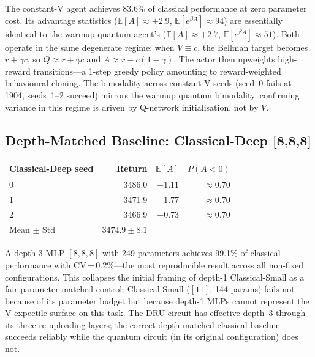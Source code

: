\documentclass[10pt,a4paper]{article}
\begin{document}
The constant-V agent achieves 83.6\% of classical performance at zero
parameter cost.
Its advantage statistics ($\mathbb{E}[A]\approx+2.9$,
$\mathbb{E}[e^{\beta A}]\approx94$) are essentially identical to the warmup
quantum agent's ($\mathbb{E}[A]\approx+2.7$, $\mathbb{E}[e^{\beta A}]\approx51$).
Both operate in the same degenerate regime: when $V\equiv c$, the Bellman
target becomes $r+\gamma c$, so $Q\approx r+\gamma c$ and
$A\approx r-c(1-\gamma)$.
The actor then upweights high-reward transitions---a 1-step greedy policy
amounting to reward-weighted behavioural cloning.
The bimodality across constant-V seeds (seed~0 fails at 1904, seeds~1--2
succeed) mirrors the warmup quantum bimodality, confirming variance in this
regime is driven by Q-network initialisation, not by $V$.

\subsection{Depth-Matched Baseline: Classical-Deep [8,8,8]}

\begin{center}
\setlength{\tabcolsep}{8pt}
\begin{tabular}{lrrr}
\toprule
Classical-Deep seed & Return & $\mathbb{E}[A]$ & $P(A{<}0)$ \\
\midrule
0 & 3486.0 & $-1.11$ & $\approx0.70$ \\
1 & 3471.9 & $-1.77$ & $\approx0.70$ \\
2 & 3466.9 & $-0.73$ & $\approx0.70$ \\
\midrule
Mean $\pm$ Std & $3474.9 \pm 8.1$ & & \\
\bottomrule
\end{tabular}
\end{center}

A depth-3 MLP $[8,8,8]$ with 249 parameters achieves 99.1\% of classical
performance with CV\,=\,0.2\%---the most reproducible result across all
non-fixed configurations.
This collapses the initial framing of depth-1 Classical-Small as a fair
parameter-matched control: Classical-Small ($[11]$, 144 params) fails not
because of its parameter budget but because depth-1 MLPs cannot represent
the V-expectile surface on this task.
The DRU circuit has effective depth~3 through its three re-uploading layers;
the correct depth-matched classical baseline succeeds reliably while the
quantum circuit (in its original configuration) does not.

\end{document}
